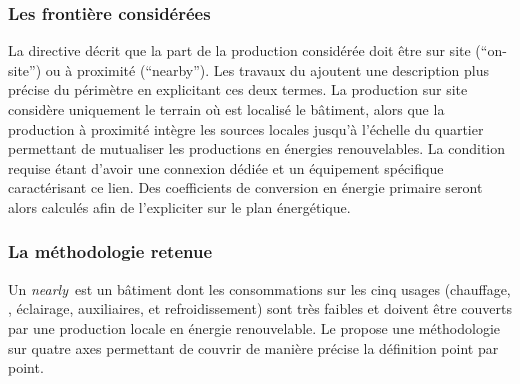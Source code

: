 \subsubsection{Les frontière considérées} %
\label{ssub:les_frontière_considérées}
La directive décrit que la part de la production considérée doit être sur site
(\enquote{on-site}) ou à proximité (\enquote{nearby}). Les travaux du  ajoutent une
description plus précise du périmètre en explicitant ces deux termes. La production sur
site considère uniquement le terrain où est localisé le bâtiment, alors que la production
à proximité intègre les sources locales jusqu’à l’échelle du quartier permettant de
mutualiser les productions en énergies renouvelables. La condition requise étant d’avoir
une connexion dédiée et un équipement spécifique caractérisant ce lien. Des coefficients
de conversion en énergie primaire seront alors calculés afin de l’expliciter sur le plan
énergétique.​



\subsubsection{La méthodologie retenue} %
\label{ssub:la_methodologie_retenue}
Un \textit{nearly}\, est un bâtiment dont les consommations sur les cinq usages
(chauffage, , éclairage, auxiliaires, et refroidissement)
sont très faibles et doivent être couverts par une production locale en énergie renouvelable.
Le  propose une méthodologie sur quatre axes permettant de couvrir de manière
précise la définition point par point.


